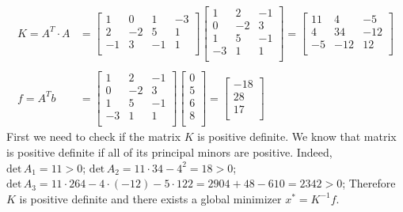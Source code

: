\documentclass[10pt,letter]{article}
\begin{document}
\begin{align*}
K = A^T \cdot A &=
\left[ {\begin{array}{cccc}
 1 &  0 & 1 & -3 \\
 2 &  -2 & 5 & 1 \\
 -1 &  3 & -1 & 1 \\
\end{array} } \right]
\left[ {\begin{array}{ccc}
 1 &  2 & -1 \\
 0 &  -2 & 3 \\
 1 &  5 & -1 \\
 -3 &  1 & 1 \\
\end{array} } \right]
=
\left[ {\begin{array}{ccc}
 11 & 4  & -5 \\
 4 & 34  & -12 \\
 -5 & -12  & 12 \\
\end{array} } \right]
\\\\ f = A^T b &= 
\left[ {\begin{array}{ccc}
 1 &  2 & -1 \\
 0 &  -2 & 3 \\
 1 &  5 & -1 \\
 -3 &  1 & 1 \\
\end{array} } \right]
\left[ {\begin{array}{c}
 0 \\
 5 \\
 6 \\
 8 \\
\end{array} } \right]
=
\left[ {\begin{array}{c}
 -18 \\
 28 \\
 17 \\
\end{array} } \right]
\end{align*}
First we need to check if the matrix $K$ is positive definite. We know that matrix is positive definite if all of its principal minors are positive. Indeed, $\textrm{det}\,A_1 = 11 > 0$; $\textrm{det}\,A_2 = 11 \cdot 34 - 4^2 = 18 > 0$; $\textrm{det}\,A_3 = 11 \cdot 264 - 4 \cdot (-12) - 5 \cdot 122 = 2904 + 48 - 610 = 2342 > 0$; Therefore $K$ is positive definite and there exists a global minimizer $x^* = K^{-1}f$.

\pagebreak
\end{document}
